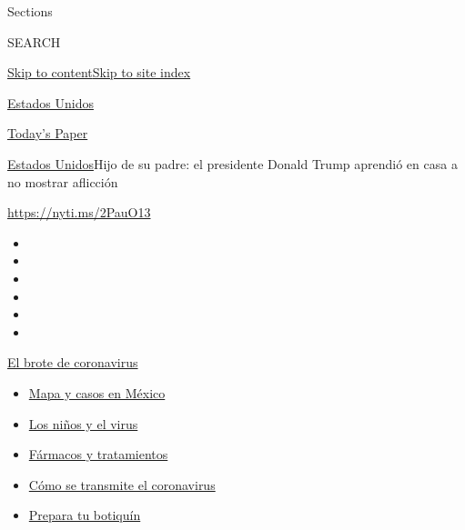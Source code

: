 Sections

SEARCH

\protect\hyperlink{site-content}{Skip to
content}\protect\hyperlink{site-index}{Skip to site index}

\href{https://www.nytimes.com/es/section/estados-unidos}{Estados Unidos}

\href{https://myaccount.nytimes.com/auth/login?response_type=cookie\&client_id=vi}{}

\href{https://www.nytimes.com/section/todayspaper}{Today's Paper}

\href{/es/section/estados-unidos}{Estados Unidos}\textbar{}Hijo de su
padre: el presidente Donald Trump aprendió en casa a no mostrar
aflicción

\url{https://nyti.ms/2PauO13}

\begin{itemize}
\item
\item
\item
\item
\item
\item
\end{itemize}

\href{https://www.nytimes.com/es/spotlight/coronavirus?action=click\&pgtype=Article\&state=default\&region=TOP_BANNER\&context=storylines_menu}{El
brote de coronavirus}

\begin{itemize}
\tightlist
\item
  \href{https://www.nytimes.com/es/interactive/2020/espanol/america-latina/coronavirus-en-mexico.html?action=click\&pgtype=Article\&state=default\&region=TOP_BANNER\&context=storylines_menu}{Mapa
  y casos en México}
\item
  \href{https://www.nytimes.com/es/2020/07/31/espanol/ciencia-y-tecnologia/ninos-contagio-coronavirus.html?action=click\&pgtype=Article\&state=default\&region=TOP_BANNER\&context=storylines_menu}{Los
  niños y el virus}
\item
  \href{https://www.nytimes.com/es/interactive/2020/science/coronavirus-tratamientos-curas.html?action=click\&pgtype=Article\&state=default\&region=TOP_BANNER\&context=storylines_menu}{Fármacos
  y tratamientos}
\item
  \href{https://www.nytimes.com/es/2020/07/06/espanol/ciencia-y-tecnologia/coronavirus-transmision-aire.html?action=click\&pgtype=Article\&state=default\&region=TOP_BANNER\&context=storylines_menu}{Cómo
  se transmite el coronavirus}
\item
  \href{https://www.nytimes.com/es/2020/07/14/espanol/estilos-de-vida/botiquin-medicina-coronavirus.html?action=click\&pgtype=Article\&state=default\&region=TOP_BANNER\&context=storylines_menu}{Prepara
  tu botiquín}
\end{itemize}

